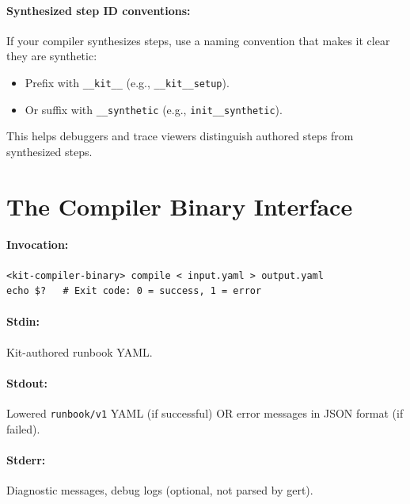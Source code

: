 \paragraph{Synthesized step ID conventions:}

If your compiler synthesizes steps, use a naming convention that makes it clear
they are synthetic:

\begin{itemize}
  \item Prefix with \texttt{\_\_kit\_\_} (e.g., \texttt{\_\_kit\_\_setup}).
  \item Or suffix with \texttt{\_\_synthetic} (e.g., \texttt{init\_\_synthetic}).
\end{itemize}

This helps debuggers and trace viewers distinguish authored steps from
synthesized steps.

\section{The Compiler Binary Interface}
\label{sec:compiler-interface}

\paragraph{Invocation:}

\begin{verbatim}
<kit-compiler-binary> compile < input.yaml > output.yaml
echo $?   # Exit code: 0 = success, 1 = error
\end{verbatim}

\paragraph{Stdin:} Kit-authored runbook YAML.

\paragraph{Stdout:} Lowered \texttt{runbook/v1} YAML (if successful) OR error
messages in JSON format (if failed).

\paragraph{Stderr:} Diagnostic messages, debug logs (optional, not parsed by gert).


